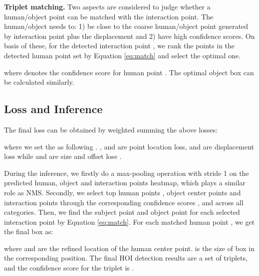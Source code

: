 \documentclass[10pt,twocolumn,letterpaper]{article}
\begin{document}
\textbf{Triplet matching.}  Two aspects are considered to judge whether a human/object point can be matched with the interaction point. The human/object needs to:   1) be close to the coarse human/object point generated by interaction point plus the displacement and  2) have high confidence scores. On basis of these, for the detected interaction point ,  we rank the points in the detected human point set   by Equation \ref{eq:match} and select the optimal one.
\vspace{-2mm}

where   denotes the confidence score for human point . The optimal object box 
 can be calculated similarly.




\subsection{Loss and Inference}
The final loss can be obtained by weighted summing the above losses:
\vspace{-1mm}

where we set the  as  following 
\cite{law2018cornernet,zhou2019objects}.
,  and  are point location loss,  and  are displacement loss while   and  are size and offset lose .


During the inference, we firstly do a  max-pooling operation with stride 1 on the predicted human, object and interaction points heatmap, which plays a similar role as NMS. Secondly, we select top  human points , object center points  and interaction points  through the corresponding confidence scores ,  and  across all categories. Then, we find the subject point and object point for each selected interaction point by  Equation \ref{eq:match}. 
For each matched human point  , we get the final box as:
\vspace{-1mm}

where  and  are the refined location of the human center point.
  is the size of box in the corresponding position. The final HOI detection results are a set of triplets, and the confidence score for the  triplet is .
\end{document}

